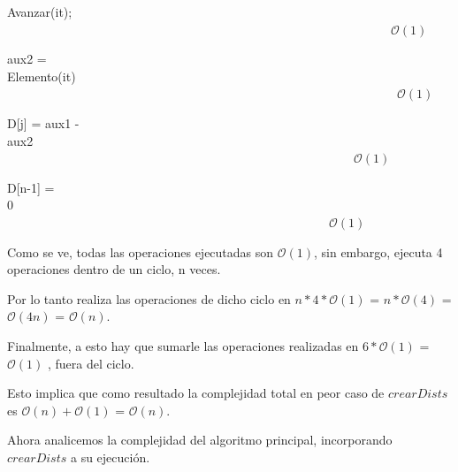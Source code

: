 \documentclass[spanish,a4paper]{article}
\begin{document}
\begin{algorithm}[H]
\begin{algorithmic}
    \STATE Avanzar(it);\ \ \ \ \ \ \ \ \ \ \ \ \ \ \ \ \ \ \ \ \ \ \ \ \ \ \ \ \ \ \ \ \ \ \ \ \ \ \ \ \ \ \ \ \ \ \ \ \ \ \ \ \ \ \ \ \ \ \ \ \ \ \ \ \ \ \ \ \ \ \ \ \ \ \ \ \ \ \ \ \ \ \ \ \ \ \ \ \ \ \ \ \ \ \ \ \ \ \ \ \ \ \ \ \ \ \ \ \ \ \ \ \ \ \ \ \ \ \ \ \ \ \ $\mathcal{O}(1)$

    \STATE aux2 = Elemento(it)\ \ \ \ \ \ \ \ \ \ \ \ \ \ \ \ \ \ \ \ \ \ \ \ \ \ \ \ \ \ \ \ \ \ \ \ \ \ \ \ \ \ \ \ \ \ \ \ \ \ \ \ \ \ \ \ \ \ \ \ \ \ \ \ \ \ \ \ \ \ \ \ \ \ \ \ \ \ \ \ \ \ \ \ \ \ \ \ \ \ \ \ \ \ \ \ \ \ \ \ \ \ \ \ \ \ \ \ \ \ \ \ \ \ \ \ \ \ \ \ \ \ \ $\mathcal{O}(1)$
    
    \STATE D[j] = aux1 - aux2\ \ \ \ \ \ \ \ \ \ \ \ \ \ \ \ \ \ \ \ \ \ \ \ \ \ \ \ \ \ \ \ \ \ \ \ \ \ \ \ \ \ \ \ \ \ \ \ \ \ \ \ \ \ \ \ \ \ \ \ \ \ \ \ \ \ \ \ \ \ \ \ \ \ \ \ \ \ \ \ \ \ \ \ \ \ \ \ \ \ \ \ \ \ \ \ \ \ \ \ \ \ \ \ \ \ \ \ \ \ \ \ \ \ \ \ \ \ \ \ \ \ \ $\mathcal{O}(1)$

    \ENDWHILE 
    
    \STATE D[n-1] = 0\ \ \ \ \ \ \ \ \ \ \ \ \ \ \ \ \ \ \ \ \ \ \ \ \ \ \ \ \ \ \ \ \ \ \ \ \ \ \ \ \ \ \ \ \ \ \ \ \ \ \ \ \ \ \ \ \ \ \ \ \ \ \ \ \ \ \ \ \ \ \ \ \ \ \ \ \ \ \ \ \ \ \ \ \ \ \ \ \ \ \ \ \ \ \ \ \ \ \ \ \ \ \ \ \ \ \ \ \ \ \ \ \ \ \ \ \ \ \ \ \ \ \ $\mathcal{O}(1)$

\end{algorithmic}
\end{algorithm}

Como se ve, todas las operaciones ejecutadas son $\mathcal{O}(1)$, sin embargo, ejecuta 4 operaciones dentro de un ciclo, n veces.

Por lo tanto realiza las operaciones de dicho ciclo en $n * 4 * \mathcal{O}(1)$ =
 $n * \mathcal{O}(4)$ =
 $\mathcal{O}(4n)$ =
 $\mathcal{O}(n)$.
 
Finalmente, a esto hay que sumarle las operaciones realizadas en $6 * \mathcal{O}(1)$ = $\mathcal{O}(1)$ , fuera del ciclo.
 
Esto implica que como resultado la complejidad total en peor caso de $crearDists$ es $\mathcal{O}(n) + \mathcal{O}(1)$ = $\mathcal{O}(n)$.
 
 Ahora analicemos la complejidad del algoritmo principal, incorporando $crearDists$ a su ejecución.
\end{document}
